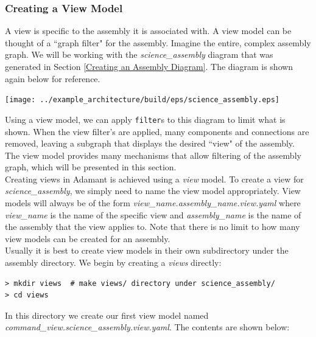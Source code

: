 \subsubsection{Creating a View Model}

A view is specific to the assembly it is associated with. A view model can be thought of a ``graph filter" for the assembly. Imagine the entire, complex assembly graph. We will be working with the \textit{science\_assembly} diagram that was generated in Section \ref{Creating an Assembly Diagram}. The diagram is shown again below for reference.

\vspace{5mm} %
\texttt{[image: ../example\_architecture/build/eps/science\_assembly.eps]}
\vspace{5mm} %

Using a view model, we can apply \texttt{filter}s to this diagram to limit what is shown. When the view filter's are applied, many components and connections are removed, leaving a subgraph that displays the desired ``view" of the assembly. The view model provides many mechanisms that allow filtering of the assembly graph, which will be presented in this section. \\

Creating views in Adamant is achieved using a \textit{view} model. To create a view for \textit{science\_assembly}, we simply need to name the view model appropriately. View models will always be of the form \textit{view\_name.assembly\_name.view.yaml} where \textit{view\_name} is the name of the specific view and \textit{assembly\_name} is the name of the assembly that the view applies to. Note that there is no limit to how many view models can be created for an assembly. \\

Usually it is best to create view models in their own subdirectory under the assembly directory. We begin by creating a \textit{views} directly:

\vspace{5mm} %
\begin{verbatim}
> mkdir views  # make views/ directory under science_assembly/
> cd views 
\end{verbatim}
\vspace{5mm} %

In this directory we create our first view model named \textit{command\_view.science\_assembly.view.yaml}. The contents are shown below: \\

